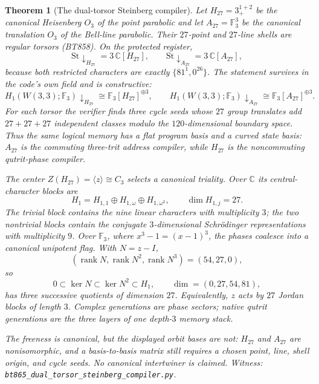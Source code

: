 \documentclass[11pt]{article}
\newtheorem{theorem}{Theorem}[section]
\newcommand{\W}{W(3,3)}
\newcommand{\GF}[1]{\mathbb{F}_{#1}}
\begin{document}
\begin{theorem}[The dual-torsor Steinberg compiler]
Let $H_{27}=3^{1+2}_{+}$ be the canonical Heisenberg $O_3$ of the
point parabolic and let $A_{27}=\GF3^3$ be the canonical translation
$O_3$ of the Bell-line parabolic.  Their $27$-point and $27$-line
shells are regular torsors (BT858).  On the protected register,
\[
 \mathrm{St}\!\downarrow_{H_{27}}=3\,\mathbb{C}[H_{27}],
 \qquad
 \mathrm{St}\!\downarrow_{A_{27}}=3\,\mathbb{C}[A_{27}],
\]
because both restricted characters are exactly
$\{81^1,0^{26}\}$.  The statement survives in the code's own field
and is constructive:
\[
 H_1(\W;\GF3)\!\downarrow_{H_{27}}
   \cong \GF3[H_{27}]^{\oplus3},
 \qquad
 H_1(\W;\GF3)\!\downarrow_{A_{27}}
   \cong \GF3[A_{27}]^{\oplus3}.
\]
For each torsor the verifier finds three cycle seeds whose $27$ group
translates add $27+27+27$ independent classes modulo the
$120$-dimensional boundary space.  Thus the same logical memory has a
flat program basis and a curved state basis: $A_{27}$ is the
commuting three-trit address compiler, while $H_{27}$ is the
noncommuting qutrit-phase compiler.

The center $Z(H_{27})=\langle z\rangle\cong C_3$ selects a canonical
triality.  Over $\mathbb{C}$ its central-character blocks are
\[
 H_1=H_{1,1}\oplus H_{1,\omega}\oplus H_{1,\omega^2},
 \qquad \dim H_{1,j}=27.
\]
The trivial block contains the nine linear characters with
multiplicity $3$; the two nontrivial blocks contain the conjugate
$3$-dimensional Schr\"odinger representations with multiplicity $9$.
Over $\GF3$, where $x^3-1=(x-1)^3$, the phases coalesce into a
canonical unipotent flag.  With $N=z-I$,
\[
 (\operatorname{rank}N,\operatorname{rank}N^2,
   \operatorname{rank}N^3)=(54,27,0),
\]
so
\[
 0\subset\ker N\subset\ker N^2\subset H_1,
 \qquad \dim=(0,27,54,81),
\]
has three successive quotients of dimension $27$.  Equivalently,
$z$ acts by $27$ Jordan blocks of length $3$.  Complex generations
are phase sectors; native qutrit generations are the three layers of
one depth-$3$ memory stack.

The freeness is canonical, but the displayed orbit bases are not:
$H_{27}$ and $A_{27}$ are nonisomorphic, and a basis-to-basis matrix
still requires a chosen point, line, shell origin, and cycle seeds.
No canonical intertwiner is claimed.
\emph{Witness:
\texttt{bt865\_dual\_torsor\_steinberg\_compiler.py}.}
\end{theorem}
\end{document}
